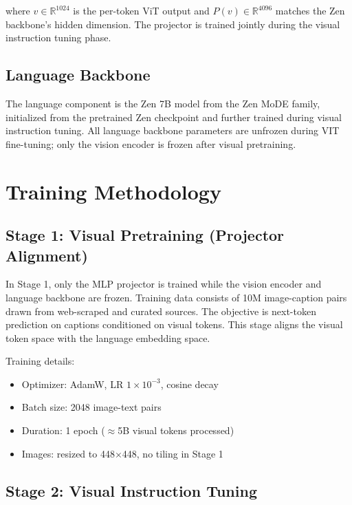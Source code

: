 \documentclass[11pt,a4paper]{article}
\begin{document}
where $v \in \mathbb{R}^{1024}$ is the per-token ViT output and $P(v) \in \mathbb{R}^{4096}$
matches the Zen backbone's hidden dimension. The projector is trained jointly during
the visual instruction tuning phase.

\subsection{Language Backbone}

The language component is the Zen 7B model from the Zen MoDE family, initialized from the
pretrained Zen checkpoint and further trained during visual instruction tuning. All language
backbone parameters are unfrozen during VIT fine-tuning; only the vision encoder is frozen
after visual pretraining.

\section{Training Methodology}

\subsection{Stage 1: Visual Pretraining (Projector Alignment)}

In Stage 1, only the MLP projector is trained while the vision encoder and language backbone
are frozen. Training data consists of 10M image-caption pairs drawn from web-scraped and
curated sources. The objective is next-token prediction on captions conditioned on visual
tokens. This stage aligns the visual token space with the language embedding space.

Training details:
\begin{itemize}
  \item Optimizer: AdamW, LR $1 \times 10^{-3}$, cosine decay
  \item Batch size: 2048 image-text pairs
  \item Duration: 1 epoch ($\approx$5B visual tokens processed)
  \item Images: resized to 448$\times$448, no tiling in Stage 1
\end{itemize}

\subsection{Stage 2: Visual Instruction Tuning}
\end{document}
